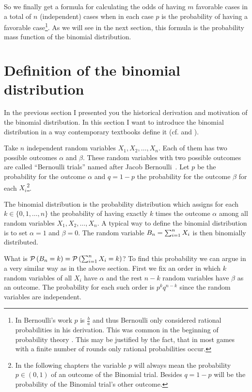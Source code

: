 So we finally get a formula for calculating the odds of having $m$ favorable cases in a total of $n$ (independent) cases when in each case $p$ is the probability of having a favorable case\footnote{In Bernoulli's work $p$ is $\tfrac ba$ and thus Bernoulli only considered rational probabilities in his derivation. This was common in the beginning of probability theory . This may be justified by the fact, that in most games with a finite number of rounds only rational probabilities occur.}. As we will see in the next section, this formula is the probability mass function of the binomial distribution.

\section{Definition of the binomial distribution}

In the previous section I presented you the historical derivation and motivation of the binomial distribution. In this section I want to introduce the binomial distribution in a way contemporary textbooks define it (cf. \cite[p. 33]{georgii} and \cite[pp. 57-58]{irle}).

Take $n$ independent random variables $X_1, X_2, \ldots, X_n$. Each of them has two possible outcomes $\alpha$ and $\beta$. These random variables with two possible outcomes are called ``Bernoulli trials'' named after Jacob Bernoulli~\cite[p. 45]{uspensky}\cite{wiki:bernoulli_distribution}. Let $p$ be the probability for the outcome $\alpha$ and $q=1-p$ the probability for the outcome $\beta$ for each $X_i$\footnote{In the following chapters the variable $p$ will always mean the probability $p\in(0,1)$ of an outcome of the Binomial trial. Besides $q=1-p$ will be the probability of the Binomial trial's other outcome.}.

The binomial distribution is the probability distribution which assigns for each $k\in \{0,1,\ldots,n\}$ the probability of having exactly $k$ times the outcome $\alpha$ among all random variables $X_1,X_2,\ldots,X_n$. A typical way to define the binomial distribution is to set $\alpha=1$ and $\beta=0$. The random variable $B_{n}=\sum_{i=1}^n X_i$ is then binomially distributed.

What is $\mathcal P\left({B_{n} = k}\right) = \mathcal P\left({\sum_{i=1}^n X_i=k}\right)$? To find this probability we can argue in a very similar way as in the above section. First we fix an order in which $k$ random variables of all $X_i$ have $\alpha$ and the rest $n-k$ random variables have $\beta$ as an outcome. The probability for each such order is $p^kq^{n-k}$ since the random variables are independent.

